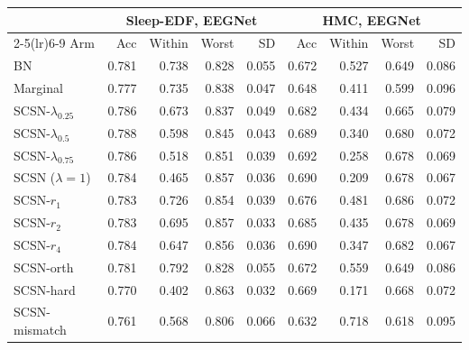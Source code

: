 \begin{tabular}{lrrrrrrrr}
\toprule
 & \multicolumn{4}{c}{Sleep-EDF, EEGNet} & \multicolumn{4}{c}{HMC, EEGNet} \\
\cmidrule(lr){2-5}\cmidrule(lr){6-9}
Arm & Acc & Within & Worst & SD & Acc & Within & Worst & SD \\
\midrule
BN & 0.781 & 0.738 & 0.828 & 0.055 & 0.672 & 0.527 & 0.649 & 0.086 \\
Marginal & 0.777 & 0.735 & 0.838 & 0.047 & 0.648 & 0.411 & 0.599 & 0.096 \\
SCSN-$\lambda_{0.25}$ & 0.786 & 0.673 & 0.837 & 0.049 & 0.682 & 0.434 & 0.665 & 0.079 \\
SCSN-$\lambda_{0.5}$ & 0.788 & 0.598 & 0.845 & 0.043 & 0.689 & 0.340 & 0.680 & 0.072 \\
SCSN-$\lambda_{0.75}$ & 0.786 & 0.518 & 0.851 & 0.039 & 0.692 & 0.258 & 0.678 & 0.069 \\
SCSN ($\lambda=1$) & 0.784 & 0.465 & 0.857 & 0.036 & 0.690 & 0.209 & 0.678 & 0.067 \\
SCSN-$r_1$ & 0.783 & 0.726 & 0.854 & 0.039 & 0.676 & 0.481 & 0.686 & 0.072 \\
SCSN-$r_2$ & 0.783 & 0.695 & 0.857 & 0.033 & 0.685 & 0.435 & 0.678 & 0.069 \\
SCSN-$r_4$ & 0.784 & 0.647 & 0.856 & 0.036 & 0.690 & 0.347 & 0.682 & 0.067 \\
SCSN-orth & 0.781 & 0.792 & 0.828 & 0.055 & 0.672 & 0.559 & 0.649 & 0.086 \\
SCSN-hard & 0.770 & 0.402 & 0.863 & 0.032 & 0.669 & 0.171 & 0.668 & 0.072 \\
SCSN-mismatch & 0.761 & 0.568 & 0.806 & 0.066 & 0.632 & 0.718 & 0.618 & 0.095 \\
\bottomrule
\end{tabular}
